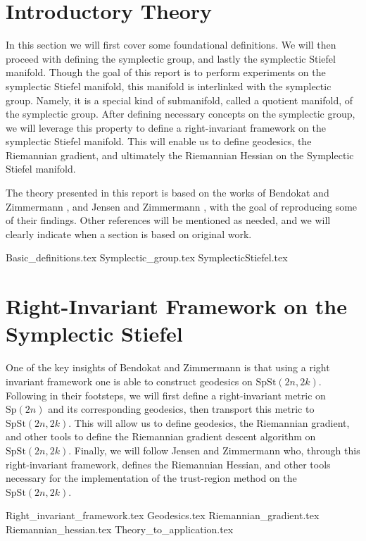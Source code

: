 \section{Introductory Theory}\label{sec:Introductory_theory}
In this section we will first cover some foundational definitions. We will then proceed with defining the symplectic group, and lastly the symplectic Stiefel manifold. Though the goal of this report is to perform experiments on the symplectic Stiefel manifold, this manifold is interlinked with the symplectic group. Namely, it is a special kind of submanifold, called a quotient manifold, of the symplectic group. After defining necessary concepts on the symplectic group, we will leverage this property to define a right-invariant framework on the symplectic Stiefel manifold. This will enable us to define geodesics, the Riemannian gradient, and ultimately the Riemannian Hessian on the Symplectic Stiefel manifold. 

The theory presented in this report is based on the works of Bendokat and Zimmermann \cite{BendokatZimmermann2021}, and Jensen and Zimmermann \cite{JensenZimmermann2024}, with the goal of reproducing some of their findings. Other references will be mentioned as needed, and we will clearly indicate when a section is based on original work. 

{Basic_definitions.tex}
{Symplectic_group.tex}
{SymplecticStiefel.tex}

\section{Right-Invariant Framework on the Symplectic Stiefel}\label{sec:right_invariant_framework}
One of the key insights of Bendokat and Zimmermann \cite[p.~11]{BendokatZimmermann2021} is that using a right invariant framework one is able to construct geodesics on $\mathrm{SpSt}(2n, 2k)$. Following in their footsteps, we will first define a right-invariant metric on $\mathrm{Sp}(2n)$ and its corresponding geodesics, then transport this metric to $\mathrm{SpSt}(2n, 2k)$. This will allow us to define geodesics, the Riemannian gradient, and other tools to define the Riemannian gradient descent algorithm on $\mathrm{SpSt}(2n, 2k)$. Finally, we will follow Jensen and Zimmermann \cite[p.~10]{JensenZimmermann2024} who, through this right-invariant framework, defines the Riemannian Hessian, and other tools necessary for the implementation of the trust-region method on the $\mathrm{SpSt}(2n, 2k)$. 

{Right_invariant_framework.tex}
{Geodesics.tex}
{Riemannian_gradient.tex}
{Riemannian_hessian.tex}
{Theory_to_application.tex}
